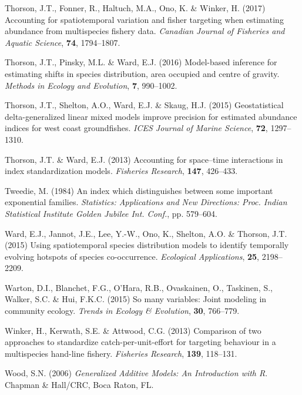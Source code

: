 \documentclass[]{article}
\begin{document}
\leavevmode\hypertarget{ref-thorson2017}{}%
Thorson, J.T., Fonner, R., Haltuch, M.A., Ono, K. \& Winker, H. (2017)
Accounting for spatiotemporal variation and fisher targeting when
estimating abundance from multispecies fishery data. \emph{Canadian
Journal of Fisheries and Aquatic Science}, \textbf{74}, 1794--1807.

\leavevmode\hypertarget{ref-thorson2016}{}%
Thorson, J.T., Pinsky, M.L. \& Ward, E.J. (2016) Model-based inference
for estimating shifts in species distribution, area occupied and centre
of gravity. \emph{Methods in Ecology and Evolution}, \textbf{7},
990--1002.

\leavevmode\hypertarget{ref-thorson2015}{}%
Thorson, J.T., Shelton, A.O., Ward, E.J. \& Skaug, H.J. (2015)
Geostatistical delta-generalized linear mixed models improve precision
for estimated abundance indices for west coast groundfishes. \emph{ICES
Journal of Marine Science}, \textbf{72}, 1297--1310.

\leavevmode\hypertarget{ref-thorson2013}{}%
Thorson, J.T. \& Ward, E.J. (2013) Accounting for space--time
interactions in index standardization models. \emph{Fisheries Research},
\textbf{147}, 426--433.

\leavevmode\hypertarget{ref-tweedie1984}{}%
Tweedie, M. (1984) An index which distinguishes between some important
exponential families. \emph{Statistics: Applications and New Directions:
Proc. Indian Statistical Institute Golden Jubilee Int. Conf.}, pp.
579--604.

\leavevmode\hypertarget{ref-ward2015}{}%
Ward, E.J., Jannot, J.E., Lee, Y.-W., Ono, K., Shelton, A.O. \& Thorson,
J.T. (2015) Using spatiotemporal species distribution models to identify
temporally evolving hotspots of species co-occurrence. \emph{Ecological
Applications}, \textbf{25}, 2198--2209.

\leavevmode\hypertarget{ref-warton2015}{}%
Warton, D.I., Blanchet, F.G., O'Hara, R.B., Ovaskainen, O., Taskinen,
S., Walker, S.C. \& Hui, F.K.C. (2015) So many variables: Joint modeling
in community ecology. \emph{Trends in Ecology \& Evolution},
\textbf{30}, 766--779.

\leavevmode\hypertarget{ref-winker2013a}{}%
Winker, H., Kerwath, S.E. \& Attwood, C.G. (2013) Comparison of two
approaches to standardize catch-per-unit-effort for targeting behaviour
in a multispecies hand-line fishery. \emph{Fisheries Research},
\textbf{139}, 118--131.

\leavevmode\hypertarget{ref-wood2006}{}%
Wood, S.N. (2006) \emph{Generalized Additive Models: An Introduction
with R}. Chapman \& Hall/CRC, Boca Raton, FL.
\end{document}
